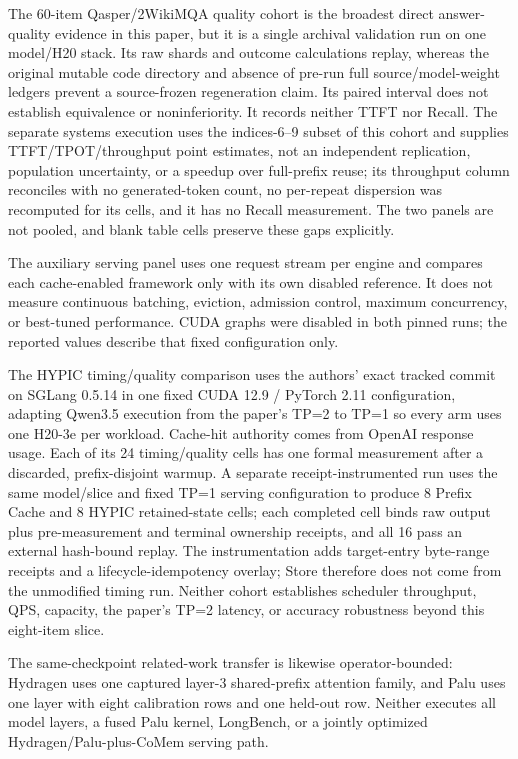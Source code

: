 \documentclass{article}
\begin{document}
The 60-item Qasper/2WikiMQA quality cohort is the broadest direct answer-quality
evidence in this paper, but it is a single archival validation run on one
model/H20 stack.  Its raw shards and outcome calculations replay, whereas the
original mutable code directory and absence of pre-run full source/model-weight
ledgers prevent a source-frozen regeneration claim.  Its paired interval does
not establish equivalence or noninferiority.  It records neither TTFT nor
Recall.  The separate systems execution uses the indices-6--9 subset of this
cohort and supplies TTFT/TPOT/throughput point estimates, not an independent
replication, population uncertainty, or a speedup over full-prefix reuse; its
throughput column reconciles with no generated-token count, no per-repeat
dispersion was recomputed for its cells, and it has no Recall measurement.  The two panels are not pooled, and blank
table cells preserve these gaps explicitly.

The auxiliary serving panel uses one request stream per engine and compares
each cache-enabled framework only with its own disabled reference.  It does not
measure continuous batching, eviction, admission control, maximum concurrency,
or best-tuned performance.  CUDA graphs were disabled in both pinned runs; the
reported values describe that fixed configuration only.

The HYPIC timing/quality comparison uses the authors' exact tracked commit on
SGLang 0.5.14 in one fixed CUDA 12.9 / PyTorch 2.11 configuration, adapting
Qwen3.5 execution from the paper's TP=2 to TP=1 so every arm uses one H20-3e per
workload.  Cache-hit authority comes from OpenAI response usage.  Each of its 24
timing/quality cells has one formal measurement after a discarded,
prefix-disjoint warmup.  A separate receipt-instrumented run uses the same
model/slice and fixed TP=1 serving configuration to produce 8 Prefix Cache and
8 HYPIC retained-state cells; each completed cell binds raw output plus
pre-measurement and terminal ownership receipts, and all 16 pass an external
hash-bound replay.  The instrumentation adds target-entry byte-range receipts
and a lifecycle-idempotency overlay; Store therefore does not come from the
unmodified timing run.  Neither cohort establishes scheduler throughput, QPS,
capacity, the paper's TP=2 latency, or accuracy robustness beyond this
eight-item slice.

The same-checkpoint related-work transfer is likewise operator-bounded:
Hydragen uses one captured layer-3 shared-prefix attention family, and Palu
uses one layer with eight calibration rows and one held-out row.  Neither
executes all model layers, a fused Palu kernel, LongBench, or a jointly
optimized Hydragen/Palu-plus-CoMem serving path.
\end{document}
